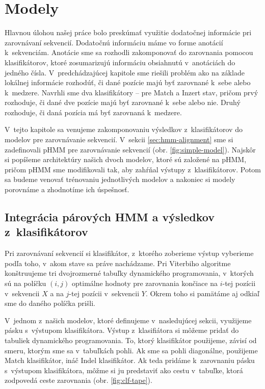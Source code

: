 \chapter{Modely}
\label{chap:models}

Hlavnou úlohou našej práce bolo preskúmať využitie dodatočnej informácie pri zarovnávaní sekvencií. Dodatočnú informáciu máme vo forme anotácií k~sekvenciám. Anotácie sme sa rozhodli zakomponovať do zarovnania pomocou klasifikátorov, ktoré zosumarizujú informáciu obsiahnutú v~anotáciách do jedného čísla. V~predchádzajúcej kapitole sme riešili problém ako na základe lokálnej informácie rozhodúť, či dané pozície majú byť zarovnané k~sebe alebo k~medzere. Navrhli sme dva klasifikátory -- pre Match a Inzert stav, pričom prvý rozhoduje, či dané dve pozície majú byť zarovnané k~sebe alebo nie. Druhý rozhoduje, či daná pozícia má byť zarovnaná k~medzere.

V~tejto kapitole sa venujeme zakomponovaniu výsledkov z~klasifikátorov do modelov pre zarovnávanie sekvencií. V~sekcii \ref{sec:hmm-alignment} sme si zadefinovali pHMM pre zarovnávanie sekvencií (obr. \ref{fig:simple-model}).
Najskôr si popíšeme architektúry našich dvoch modelov, ktoré sú založené na pHMM, pričom pHMM sme modifikovali tak, aby zahŕňal výstupy z~klasifikátorov. Potom sa budeme venovať trénovaniu jednotlivých modelov a nakoniec si modely porovnáme a zhodnotíme ich úspešnosť.

\section[Integrácia pHMM a klasifikátorov]{Integrácia párových HMM a výsledkov z~klasifikátorov}

Pri zarovnávaní sekvencií si klasifikátor, z~ktorého zoberieme výstup vyberieme podľa toho, v~akom stave sa práve nachádzame. Pri Viterbiho algoritme konštruujeme tri dvojrozmerné tabuľky dynamického programovania, v~ktorých sú na políčku $(i, j)$ optimálne hodnoty pre zarovnania končiace na $i$-tej pozícii v~sekvencii $X$ a na $j$-tej pozícii v~sekvencii $Y$. Okrem toho si pamätáme aj odkiaľ sme do daného políčka prišli.

V~jednom z~našich modelov, ktoré definujeme v~nasledujúcej sekcii, využijeme pásku s~výstupom klasifikátora. Výstup z~klasifiátora si môžeme pridať do tabuliek dynamického programovania.
To, ktorý klasifikátor použijeme, závisí od smeru, ktorým sme sa v~tabuľkách pohli. Ak sme sa pohli diagonálne, použijeme Match klasifikátor, ináč Indel klasifikátor.
Ak teda pridáme k~zarovnaniu pásku s~výstupom klasifikátora, môžme si ju predstaviť ako cestu v~tabuľke, ktorá zodpovedá ceste zarovnania
(obr. \ref{fig:clf-tape}).


